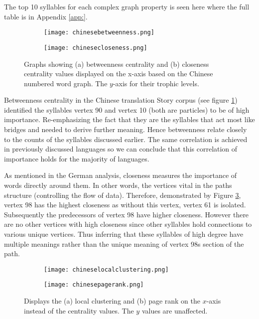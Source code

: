 The top 10 syllables for each complex graph property is seen here where the full table is in Appendix \ref{app:}.

\begin{figure}[H]
\centering
\begin{subfigure}{.45\textwidth}
	\hspace{-1cm} 
	\texttt{[image: chinesebetweenness.png]}
	\caption{}
	\label{fig:cnbc}
\end{subfigure}
\hfill
\begin{subfigure}{.45\textwidth}
	\hspace{-1cm} 
	\texttt{[image: chinesecloseness.png]}
	\caption{ }
	\label{fig:cncc}
\end{subfigure}
\caption{Graphs showing (a) betweenness centrality and (b) closeness centrality values displayed on the x-axis based on the Chinese numbered word graph. The $y$-axis for their trophic levels.}
\label{fig:cncentrality}
\end{figure}

Betweenness centrality in the Chinese translation Story corpus (see figure \ref{fig:cnbc}) identified the syllables vertex 90 and vertex 10 (both are particles) to be of high importance. Re-emphasizing the fact that they are the syllables that act most like bridges and needed to derive further meaning. Hence betweenness relate closely to the counts of the syllables discussed earlier. The same correlation is achieved in previously discussed languages so we can conclude that this correlation of importance holds for the majority of languages.

As mentioned in the German analysis, closeness measures the importance of words directly around them. In other words, the vertices vital in the paths structure (controlling the flow of data). Therefore, demonstrated by Figure \ref{fig:cncentrality}, vertex 98 has the highest closeness as without this vertex, vertex 61 is isolated. Subsequently the predecessors of vertex 98 have higher closeness. However there are no other vertices with high closeness since other syllables hold connections to various unique vertices. Thus inferring that these syllables of high degree have multiple meanings rather than the unique meaning of vertex 98s section of the path.

\begin{figure}[H]
\centering
\begin{subfigure}{.45\textwidth}
	\hspace{-1cm} 
	\texttt{[image: chineselocalclustering.png]}
	\caption{}
	\label{fig:cnlc}
\end{subfigure}
\hfill
\begin{subfigure}{.45\textwidth}
	\hspace{-1cm} 
	\texttt{[image: chinesepagerank.png]}
	\caption{}
	\label{fig:cnpr}
\end{subfigure}
\caption{Displays the (a) local clustering and (b) page rank on the $x$-axis instead of the centrality values. The $y$ values are unaffected.}
\label{fig:cnother}
\end{figure}

